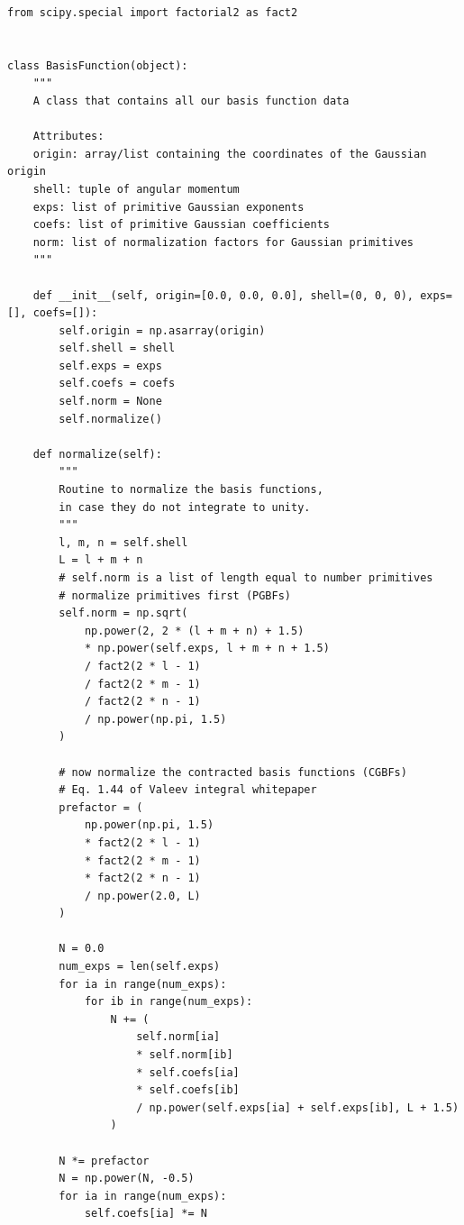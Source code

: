 \begin{lstlisting}[style=MyPython]
from scipy.special import factorial2 as fact2


class BasisFunction(object):
    """
    A class that contains all our basis function data

    Attributes:
    origin: array/list containing the coordinates of the Gaussian origin
    shell: tuple of angular momentum
    exps: list of primitive Gaussian exponents
    coefs: list of primitive Gaussian coefficients
    norm: list of normalization factors for Gaussian primitives
    """

    def __init__(self, origin=[0.0, 0.0, 0.0], shell=(0, 0, 0), exps=[], coefs=[]):
        self.origin = np.asarray(origin)
        self.shell = shell
        self.exps = exps
        self.coefs = coefs
        self.norm = None
        self.normalize()

    def normalize(self):
        """
        Routine to normalize the basis functions,
        in case they do not integrate to unity.
        """
        l, m, n = self.shell
        L = l + m + n
        # self.norm is a list of length equal to number primitives
        # normalize primitives first (PGBFs)
        self.norm = np.sqrt(
            np.power(2, 2 * (l + m + n) + 1.5)
            * np.power(self.exps, l + m + n + 1.5)
            / fact2(2 * l - 1)
            / fact2(2 * m - 1)
            / fact2(2 * n - 1)
            / np.power(np.pi, 1.5)
        )

        # now normalize the contracted basis functions (CGBFs)
        # Eq. 1.44 of Valeev integral whitepaper
        prefactor = (
            np.power(np.pi, 1.5)
            * fact2(2 * l - 1)
            * fact2(2 * m - 1)
            * fact2(2 * n - 1)
            / np.power(2.0, L)
        )

        N = 0.0
        num_exps = len(self.exps)
        for ia in range(num_exps):
            for ib in range(num_exps):
                N += (
                    self.norm[ia]
                    * self.norm[ib]
                    * self.coefs[ia]
                    * self.coefs[ib]
                    / np.power(self.exps[ia] + self.exps[ib], L + 1.5)
                )

        N *= prefactor
        N = np.power(N, -0.5)
        for ia in range(num_exps):
            self.coefs[ia] *= N
\end{lstlisting}

\vspace{5pt}

